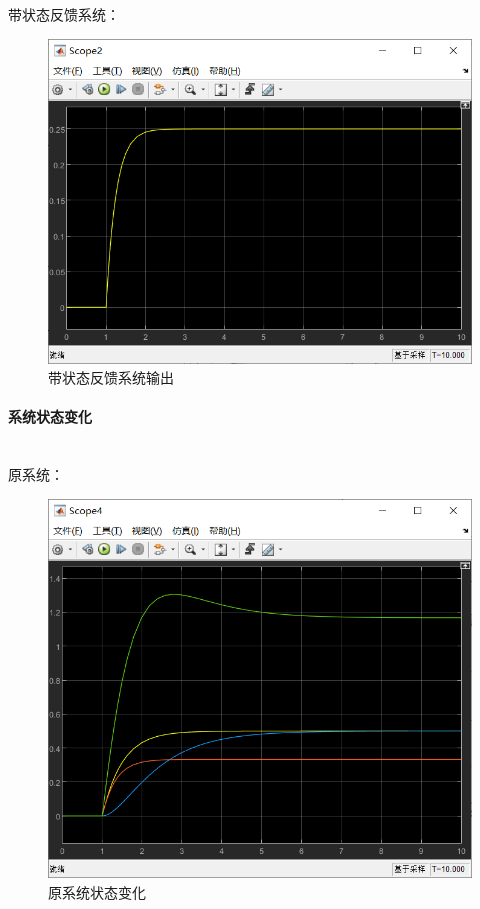 \documentclass[UTF8]{article}
\begin{document}
带状态反馈系统：
\begin{figure}[H]
    \centering %
    \includegraphics[width=.8\textwidth]{figure/exp3_1_带状态反馈系统输出.png} 
    \caption{带状态反馈系统输出} %
\end{figure}

\paragraph{系统状态变化}~{}
\\
原系统：
\begin{figure}[H]
    \centering %
    \includegraphics[width=.8\textwidth]{figure/exp3_1_原系统状态.png} 
    \caption{原系统状态变化} %
\end{figure}
\end{document}
